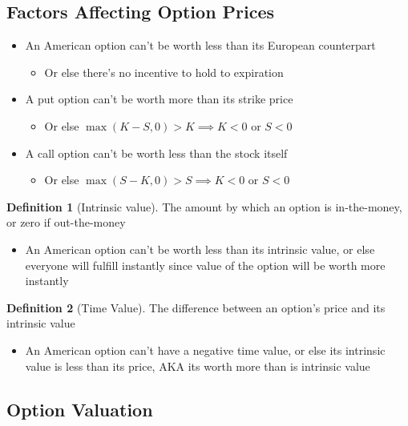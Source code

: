 \documentclass[11pt]{article}
\theoremstyle{definition}
\newtheorem*{definition}{Definition}
\begin{document}
\subsection{Factors Affecting Option Prices}
\begin{itemize}
    \item An American option can't be worth less than its European counterpart
    \begin{itemize}
        \item Or else there's no incentive to hold to expiration
    \end{itemize}
    \item A put option can't be worth more than its strike price
    \begin{itemize}
        \item Or else $\max(K-S, 0) > K \implies K < 0$ or $S < 0$
    \end{itemize}
    \item A call option can't be worth less than the stock itself
    \begin{itemize}
        \item Or else $\max(S-K, 0) > S \implies K < 0$ or $S < 0$
    \end{itemize}
\end{itemize}
\begin{definition}[Intrinsic value]
    The amount by which an option is in-the-money, or zero if out-the-money
\end{definition}
\begin{itemize}
\item An American option can't be worth less than its intrinsic value, or else everyone will fulfill instantly since value of the option will be worth more instantly 
\end{itemize}
\begin{definition}[Time Value]
    The difference between an option's price and its intrinsic value
\end{definition}
\begin{itemize}
    \item An American option can't have a negative time value, or else its intrinsic value is less than its price, AKA its worth more than is intrinsic value
\end{itemize}


\subsection{Option Valuation}
\end{document}
